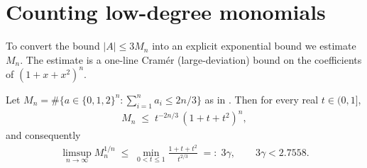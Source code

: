 \section{Counting low-degree monomials}\label{sec:count}

To convert the bound $|A|\le 3M_n$ into an explicit exponential bound we estimate
$M_n$. The estimate is a one-line Cramér (large-deviation) bound on the coefficients
of $(1+x+x^2)^n$.

\begin{lemma}\label{lem:monomial-count}
Let $M_n=\#\{a\in\{0,1,2\}^n:\sum_{i=1}^n a_i\le 2n/3\}$ as in
. Then for every real $t\in(0,1]$,
\begin{align}\label{eq:Mn-bound}
M_n\;\le\;t^{-2n/3}\,(1+t+t^2)^n,
\end{align}
and consequently
\begin{align}\label{eq:gamma-def}
\limsup_{n\to\infty} M_n^{1/n}\;\le\;\min_{0<t\le 1}\frac{1+t+t^2}{t^{2/3}}\;=:\;3\gamma,
\qquad 3\gamma<2.7558.
\end{align}
\end{lemma}

